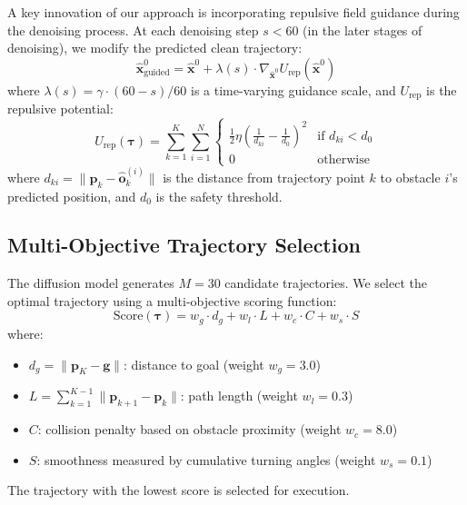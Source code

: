 \documentclass[letterpaper, 10 pt, conference]{ieeeconf}
\begin{document}
A key innovation of our approach is incorporating repulsive field guidance during the denoising process. At each denoising step $s < 60$ (in the later stages of denoising), we modify the predicted clean trajectory:
\begin{equation}
    \hat{\mathbf{x}}^0_{\text{guided}} = \hat{\mathbf{x}}^0 + \lambda(s) \cdot \nabla_{\hat{\mathbf{x}}^0} U_{\text{rep}}(\hat{\mathbf{x}}^0)
\end{equation}
where $\lambda(s) = \gamma \cdot (60 - s) / 60$ is a time-varying guidance scale, and $U_{\text{rep}}$ is the repulsive potential:
\begin{equation}
    U_{\text{rep}}(\boldsymbol{\tau}) = \sum_{k=1}^{K} \sum_{i=1}^{N} \begin{cases}
        \frac{1}{2}\eta\left(\frac{1}{d_{ki}} - \frac{1}{d_0}\right)^2 & \text{if } d_{ki} < d_0 \\
        0 & \text{otherwise}
    \end{cases}
\end{equation}
where $d_{ki} = \|\mathbf{p}_k - \hat{\mathbf{o}}^{(i)}_k\|$ is the distance from trajectory point $k$ to obstacle $i$'s predicted position, and $d_0$ is the safety threshold.

\subsection{Multi-Objective Trajectory Selection}

The diffusion model generates $M=30$ candidate trajectories. We select the optimal trajectory using a multi-objective scoring function:
\begin{equation}
    \text{Score}(\boldsymbol{\tau}) = w_g \cdot d_g + w_l \cdot L + w_c \cdot C + w_s \cdot S
\end{equation}
where:
\begin{itemize}
    \item $d_g = \|\mathbf{p}_K - \mathbf{g}\|$: distance to goal (weight $w_g = 3.0$)
    \item $L = \sum_{k=1}^{K-1} \|\mathbf{p}_{k+1} - \mathbf{p}_k\|$: path length (weight $w_l = 0.3$)
    \item $C$: collision penalty based on obstacle proximity (weight $w_c = 8.0$)
    \item $S$: smoothness measured by cumulative turning angles (weight $w_s = 0.1$)
\end{itemize}

The trajectory with the lowest score is selected for execution.
\end{document}
